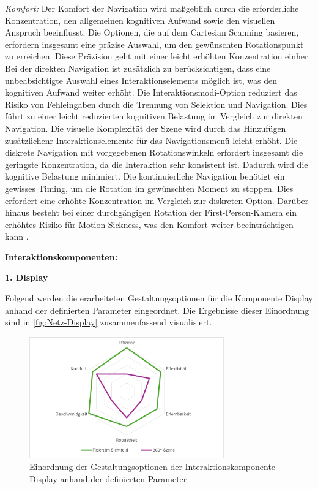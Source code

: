 \textit{Komfort:}
Der Komfort der Navigation wird maßgeblich durch die erforderliche Konzentration, den allgemeinen kognitiven Aufwand sowie den visuellen Anspruch beeinflusst. Die Optionen, die auf dem Cartesian Scanning basieren, erfordern insgesamt eine präzise Auswahl, um den gewünschten Rotationspunkt zu erreichen. Diese Präzision geht mit einer leicht erhöhten Konzentration einher. Bei der direkten Navigation ist zusätzlich zu berücksichtigen, dass eine unbeabsichtigte Auswahl eines Interaktionselements möglich ist, was den kognitiven Aufwand weiter erhöht. Die Interaktionsmodi-Option reduziert das Risiko von Fehleingaben durch die Trennung von Selektion und Navigation. Dies führt zu einer leicht reduzierten kognitiven Belastung im Vergleich zur direkten Navigation. Die visuelle Komplexität der Szene wird durch das Hinzufügen zusätzlichenr Interaktionselemente für das Navigationsmenü leicht erhöht. Die diskrete Navigation mit vorgegebenen Rotationswinkeln erfordert insgesamt die geringste Konzentration, da die Interaktion sehr konsistent ist. Dadurch wird die kognitive Belastung minimiert.
Die kontinuierliche Navigation benötigt ein gewisses Timing, um die Rotation im gewünschten Moment zu stoppen. Dies erfordert eine erhöhte Konzentration im Vergleich zur diskreten Option. Darüber hinaus besteht bei einer durchgängigen Rotation der First-Person-Kamera ein erhöhtes Risiko für Motion Sickness, was den Komfort weiter beeinträchtigen kann \citep{10.1007/s10055-020-00425-x, 8797722}.


{\normalfont \bfseries Interaktionskomponenten:} 

\textbf{1. Display}

Folgend werden die erarbeiteten Gestaltungsoptionen für die Komponente Display anhand der definierten Parameter eingeordnet. Die Ergebnisse dieser Einordnung sind in \autoref{fig:Netz-Display} zusammenfassend visualisiert.

\begin{figure}[tbh]
    \centering
    \includegraphics[width=0.75\textwidth]{images/Netzdiagramm-Display.png}
    \caption{Einordnung der Gestaltungsoptionen der Interaktionskomponente Display anhand der definierten Parameter}
    \label{fig:Netz-Display}
\end{figure}

